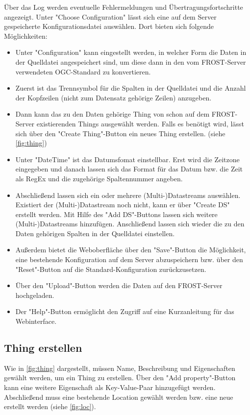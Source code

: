 \documentclass[a4paper, 12 pt]{article}
\begin{document}
Über das Log werden eventuelle Fehlermeldungen und Übertragungsfortschritte angezeigt. Unter "{Choose Configuration}" lässt sich eine auf dem Server gespeicherte Konfigurationsdatei auswählen. Dort bieten sich folgende Möglichkeiten:
\begin{itemize}
\item Unter "{Configuration}" kann eingestellt werden, in welcher Form die Daten in der Quelldatei angespeichert sind, um diese dann in den vom FROST-Server verwendeten OGC-Standard zu konvertieren.
\item Zuerst ist das Trennsymbol für die Spalten in der Quelldatei und die Anzahl der Kopfzeilen (nicht zum Datensatz gehörige Zeilen) anzugeben. 
\item Dann kann das zu den Daten gehörige Thing von schon auf dem FROST-Server existierenden Things ausgewählt werden. Falls es benötigt wird, lässt sich über den "{Create Thing}"{-Button} ein neues Thing erstellen. (siehe \cref{fig:thing})
\item Unter "{DateTime}"{ ist} das Datumsfomat einstellbar. Erst wird die Zeitzone eingegeben und danach lassen sich das Format für das Datum bzw. die Zeit als RegEx und die zugehörige Spaltennummer angeben.
\item Abschließend lassen sich ein oder mehrere (Multi-)Datastreams auswählen. Existiert der (Multi-)Datastream noch nicht, kann er über "{Create DS}"{ erstellt} werden. Mit Hilfe des "{Add DS}"{-Buttons} lassen sich weitere (Multi-)Datastreams hinzufügen. Anschließend lassen sich wieder die zu den Daten gehörigen Spalten in der Quelldatei einstellen.
\item Außerdem bietet die Weboberfläche über den "{Save}"{-Button} die Möglichkeit, eine bestehende Konfiguration auf dem Server abzuspeichern bzw. über den "{Reset}"{-Button} auf die Standard-Konfiguration zurückzusetzen.
\item Über den "{Upload}"{-Button} werden die Daten auf den FROST-Server hochgeladen.
\item Der "{Help}"{-Button} ermöglicht den Zugriff auf eine Kurzanleitung für das Webinterface.
\end{itemize}

\subsection{Thing erstellen}
Wie in \cref{fig:thing} dargestellt, müssen Name, Beschreibung und Eigenschaften gewählt werden, um ein Thing zu erstellen. Über den "{Add property}"{-Button} kann eine weitere Eigenschaft als Key-Value-Paar hinzugefügt werden. Abschließend muss eine bestehende Location gewählt werden bzw. eine neue erstellt werden (siehe \cref{fig:loc}).
\end{document}
